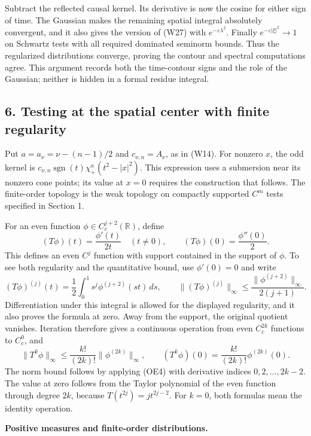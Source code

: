 \documentclass[
  11pt,
]{article}
\begin{document}
Subtract the reflected causal kernel. Its derivative is now the cosine
for either sign of time. The Gaussian makes the remaining spatial
integral absolutely convergent, and it also gives the version of (W27)
with \(e^{-\varepsilon\lambda^2}\). Finally
\(e^{-\varepsilon|\xi|^2}\to1\) on Schwartz tests with all required
dominated seminorm bounds. Thus the regularized distributions converge,
proving the contour and spectral computations agree. This argument
records both the time-contour signs and the role of the Gaussian;
neither is hidden in a formal residue integral.

\subsection{6. Testing at the spatial center with finite
regularity}\label{testing-at-the-spatial-center-with-finite-regularity}

Put \(a=a_\nu=\nu-(n-1)/2\) and \(c_{\nu,n}=A_\nu\), as in (W14). For
nonzero \(x\), the odd kernel is
\(c_{\nu,n}\operatorname{sgn}(t)\chi_+^a(t^2-|x|^2)\). This expression
uses a submersion near its nonzero cone points; its value at \(x=0\)
requires the construction that follows. The finite-order topology is the
weak topology on compactly supported \(C^m\) tests specified in Section
1.

For an even function \(\phi\in C_c^{j+2}(\mathbb R)\), define \[
 (T\phi)(t)=\frac{\phi'(t)}{2t}\quad(t\ne0),\qquad
 (T\phi)(0)=\frac{\phi''(0)}2.
 \tag{OE3}
\] This defines an even \(C^j\) function with support contained in the
support of \(\phi\). To see both regularity and the quantitative bound,
use \(\phi'(0)=0\) and write \[
 (T\phi)^{(j)}(t)
   =\frac12\int_0^1 s^j\phi^{(j+2)}(st)\,ds,
 \qquad
 \|(T\phi)^{(j)}\|_\infty
   \leq\frac{\|\phi^{(j+2)}\|_\infty}{2(j+1)}.
 \tag{OE4}
\] Differentiation under this integral is allowed for the displayed
regularity, and it also proves the formula at zero. Away from the
support, the original quotient vanishes. Iteration therefore gives a
continuous operation from even \(C_c^{2k}\) functions to \(C_c^0\), and
\[
 \|T^k\phi\|_\infty
     \leq\frac{k!}{(2k)!}\|\phi^{(2k)}\|_\infty,
 \qquad
 (T^k\phi)(0)=\frac{k!}{(2k)!}\phi^{(2k)}(0).
 \tag{OE5}
\] The norm bound follows by applying (OE4) with derivative indices
\(0,2,\ldots,2k-2\). The value at zero follows from the Taylor
polynomial of the even function through degree \(2k\), because
\(T(t^{2j})=j t^{2j-2}\). For \(k=0\), both formulas mean the identity
operation.

\textbf{Positive measures and finite-order distributions.}
\end{document}
